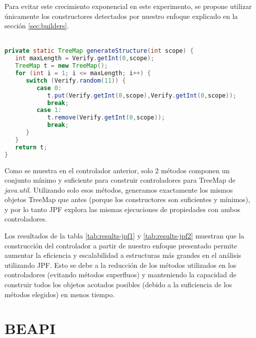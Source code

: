 
Para evitar este crecimiento exponencial en este experimento, se propone utilizar únicamente los constructores detectados por nuestro enfoque explicado en la sección \ref{sec:builders}.
\\
\\
\begin{lstlisting}[caption={Controlador con métodos constructores},label={lst:driverBLD},language=Java,captionpos=b]
private static TreeMap generateStructure(int scope) {
   int maxLength = Verify.getInt(0,scope);
   TreeMap t = new TreeMap();
   for (int i = 1; i <= maxLength; i++) {
      switch (Verify.random(11)) {
         case 0:
            t.put(Verify.getInt(0,scope),Verify.getInt(0,scope));
            break;
         case 1:
            t.remove(Verify.getInt(0,scope));
            break;						
      }
   }
   return t;
}
\end{lstlisting}

Como se muestra en el controlador anterior, solo 2 métodos componen un conjunto mínimo y suficiente para construir controladores para TreeMap de \textit{java.util}. Utilizando solo esos métodos, generamos exactamente los mismos objetos TreeMap que antes (porque los constructores son suficientes y mínimos), y por lo tanto JPF explora las mismas ejecuciones de propiedades con ambos controladores.

Los resultados de la tabla \ref{tab:results-jpf1} y \ref{tab:results-jpf2} muestran que la construcción del controlador a partir de nuestro enfoque presentado permite aumentar la eficiencia y escalabilidad a estructuras más grandes en el análisis utilizando JPF. Esto se debe a la reducción de los métodos utilizados en los controladores (evitando métodos superfluos) y manteniendo la capacidad de construir todos los objetos acotados posibles (debido a la suficiencia de los métodos elegidos) en menos tiempo.





\section{BEAPI}

